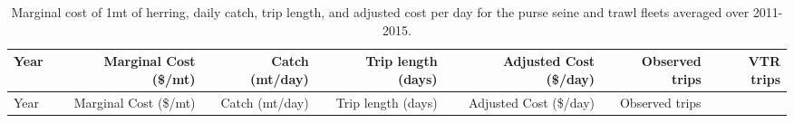 \documentclass[]{article}
\begin{document}
\newpage

\begin{longtable}[]{@{}lrrrrrr@{}}
\caption{Marginal cost of 1mt of herring, daily catch, trip length, and
adjusted cost per day for the purse seine and trawl fleets averaged over
2011-2015.\label{costs_combined}}\tabularnewline
\toprule
\begin{minipage}[b]{0.07\columnwidth}\raggedright\strut
Year\strut
\end{minipage} & \begin{minipage}[b]{0.17\columnwidth}\raggedleft\strut
Marginal Cost (\$/mt)\strut
\end{minipage} & \begin{minipage}[b]{0.11\columnwidth}\raggedleft\strut
Catch (mt/day)\strut
\end{minipage} & \begin{minipage}[b]{0.14\columnwidth}\raggedleft\strut
Trip length (days)\strut
\end{minipage} & \begin{minipage}[b]{0.15\columnwidth}\raggedleft\strut
Adjusted Cost (\$/day)\strut
\end{minipage} & \begin{minipage}[b]{0.09\columnwidth}\raggedleft\strut
Observed trips\strut
\end{minipage} & \begin{minipage}[b]{0.08\columnwidth}\raggedleft\strut
VTR trips\strut
\end{minipage}\tabularnewline
\midrule
\endfirsthead
\toprule
\begin{minipage}[b]{0.07\columnwidth}\raggedright\strut
Year\strut
\end{minipage} & \begin{minipage}[b]{0.17\columnwidth}\raggedleft\strut
Marginal Cost (\$/mt)\strut
\end{minipage} & \begin{minipage}[b]{0.11\columnwidth}\raggedleft\strut
Catch (mt/day)\strut
\end{minipage} & \begin{minipage}[b]{0.14\columnwidth}\raggedleft\strut
Trip length (days)\strut
\end{minipage} & \begin{minipage}[b]{0.15\columnwidth}\raggedleft\strut
Adjusted Cost (\$/day)\strut
\end{minipage} & \begin{minipage}[b]{0.09\columnwidth}\raggedleft\strut
Observed trips\strut
\end{minipage} & \begin{minipage}[b]{0.08\columnwidth}\raggedleft\strut

\end{minipage}
\end{longtable}
\end{document}
